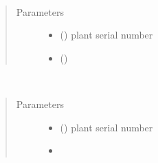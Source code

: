 \documentclass[letterpaper,10pt,english]{sphinxmanual}
\begin{document}
\begin{fulllineitems}
\label{\detokenize{index:controller.utility.update_ideal_hum}}~\begin{quote}\begin{description}
\item[{Parameters}] \leavevmode\begin{itemize}
\item {} 
 () \textendash{} plant serial number

\item {} 
 () \textendash{} 

\end{itemize}

\end{description}\end{quote}

\end{fulllineitems}


\begin{fulllineitems}
\label{\detokenize{index:controller.utility.update_ideal_light}}~\begin{quote}\begin{description}
\item[{Parameters}] \leavevmode\begin{itemize}
\item {} 
 () \textendash{} plant serial number

\item {} 
 \textendash{} 

\end{itemize}

\end{description}\end{quote}

\end{fulllineitems}
\end{document}
